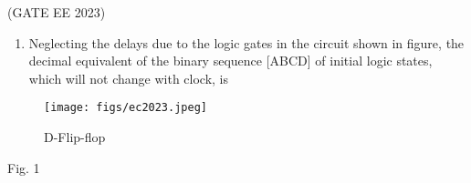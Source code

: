 \documentclass{article}
\title{\mytitle}
\author{\myauthor\\\mycontact\\IITH\hspace{0.3em}-\hspace{0.3em}\mymodule}
\theoremstyle{remark}
\begin{document}
\maketitle

\hfill(GATE EE 2023)
\begin{enumerate}
    \item  Neglecting the delays due to the logic gates in the circuit shown in figure, the 
decimal equivalent of the binary sequence [ABCD] of initial logic states, which 
will not change with clock, is 

\end{enumerate}
 \begin{figure}[H]
        \centering
        \texttt{[image: figs/ec2023.jpeg]}
        \caption{D-Flip-flop}
        \label{ec2023.jpeg}
    \end{figure}  
    
\begin{center}
Fig. 1 
\end{center}
\end{document}
